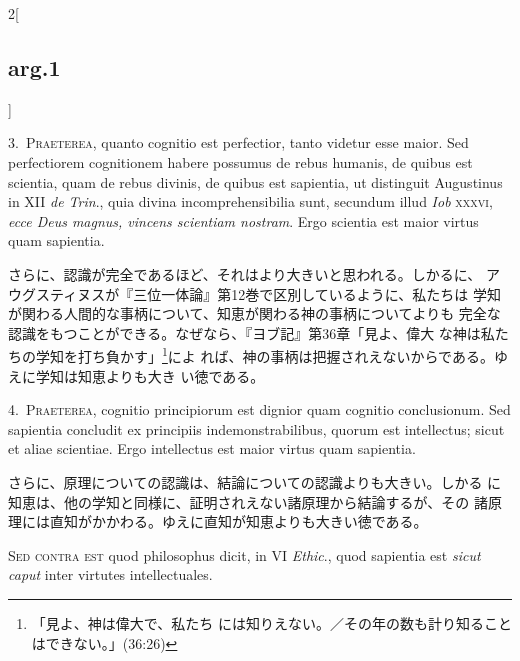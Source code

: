 \documentclass[paper=a4paper,fontsize=10pt,jafontsize=9pt,titlepage]{jlreq}
\begin{document}
\begin{paracol}{2}[\subsection{arg.1}]

3.~{\scshape Praeterea}, quanto cognitio est perfectior, tanto videtur
esse maior. Sed perfectiorem cognitionem habere possumus de rebus
humanis, de quibus est scientia, quam de rebus divinis, de quibus est
sapientia, ut distinguit Augustinus in XII {\itshape de Trin}., quia
divina incomprehensibilia sunt, secundum illud {\itshape Iob}
{\scshape xxxvi}, {\itshape ecce Deus magnus, vincens scientiam
nostram}. Ergo scientia est maior virtus quam sapientia.

\switchcolumn

さらに、認識が完全であるほど、それはより大きいと思われる。しかるに、
 アウグスティヌスが『三位一体論』第12巻で区別しているように、私たちは
 学知が関わる人間的な事柄について、知恵が関わる神の事柄についてよりも
 完全な認識をもつことができる。なぜなら、『ヨブ記』第36章「見よ、偉大
 な神は私たちの学知を打ち負かす」\footnote{「見よ、神は偉大で、私たち
 には知りえない。／その年の数も計り知ることはできない。」(36:26)}によ
 れば、神の事柄は把握されえないからである。ゆえに学知は知恵よりも大き
 い徳である。


4.~{\scshape Praeterea}, cognitio principiorum est dignior quam
cognitio conclusionum. Sed sapientia concludit ex principiis
indemonstrabilibus, quorum est intellectus; sicut et aliae
scientiae. Ergo intellectus est maior virtus quam sapientia.

\switchcolumn

さらに、原理についての認識は、結論についての認識よりも大きい。しかる
 に知恵は、他の学知と同様に、証明されえない諸原理から結論するが、その
 諸原理には直知がかかわる。ゆえに直知が知恵よりも大きい徳である。

\switchcolumn*[\subsection{s.c.}]

{\scshape Sed contra est} quod philosophus dicit, in VI {\itshape
Ethic}., quod sapientia est {\itshape sicut caput} inter virtutes
intellectuales.

\switchcolumn


\end{paracol}
\end{document}
